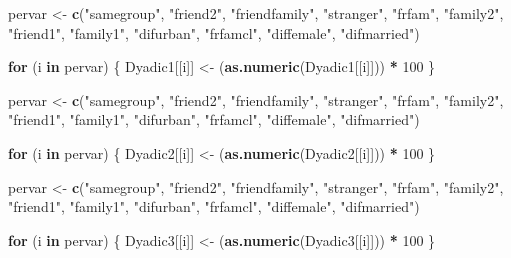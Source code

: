 \documentclass[]{tufte-handout}
\newenvironment{Shaded}{\begin{snugshade}}{\end{snugshade}}
\newcommand{\KeywordTok}[1]{\textcolor[rgb]{0.13,0.29,0.53}{\textbf{#1}}}
\newcommand{\DecValTok}[1]{\textcolor[rgb]{0.00,0.00,0.81}{#1}}
\newcommand{\StringTok}[1]{\textcolor[rgb]{0.31,0.60,0.02}{#1}}
\newcommand{\ControlFlowTok}[1]{\textcolor[rgb]{0.13,0.29,0.53}{\textbf{#1}}}
\newcommand{\OperatorTok}[1]{\textcolor[rgb]{0.81,0.36,0.00}{\textbf{#1}}}
\newcommand{\NormalTok}[1]{#1}
\begin{document}
\begin{Shaded}
\begin{Highlighting}[]
\NormalTok{pervar <-}\StringTok{ }\KeywordTok{c}\NormalTok{(}\StringTok{"samegroup"}\NormalTok{, }\StringTok{"friend2"}\NormalTok{, }\StringTok{"friendfamily"}\NormalTok{, }
    \StringTok{"stranger"}\NormalTok{, }\StringTok{"frfam"}\NormalTok{, }\StringTok{"family2"}\NormalTok{, }\StringTok{"friend1"}\NormalTok{, }
    \StringTok{"family1"}\NormalTok{, }\StringTok{"difurban"}\NormalTok{, }\StringTok{"frfamcl"}\NormalTok{, }\StringTok{"diffemale"}\NormalTok{, }
    \StringTok{"difmarried"}\NormalTok{)}

\ControlFlowTok{for}\NormalTok{ (i }\ControlFlowTok{in}\NormalTok{ pervar) \{}
\NormalTok{    Dyadic1[[i]] <-}\StringTok{ }\NormalTok{(}\KeywordTok{as.numeric}\NormalTok{(Dyadic1[[i]])) }\OperatorTok{*}\StringTok{ }
\StringTok{        }\DecValTok{100}
\NormalTok{\}}


\NormalTok{pervar <-}\StringTok{ }\KeywordTok{c}\NormalTok{(}\StringTok{"samegroup"}\NormalTok{, }\StringTok{"friend2"}\NormalTok{, }\StringTok{"friendfamily"}\NormalTok{, }
    \StringTok{"stranger"}\NormalTok{, }\StringTok{"frfam"}\NormalTok{, }\StringTok{"family2"}\NormalTok{, }\StringTok{"friend1"}\NormalTok{, }
    \StringTok{"family1"}\NormalTok{, }\StringTok{"difurban"}\NormalTok{, }\StringTok{"frfamcl"}\NormalTok{, }\StringTok{"diffemale"}\NormalTok{, }
    \StringTok{"difmarried"}\NormalTok{)}

\ControlFlowTok{for}\NormalTok{ (i }\ControlFlowTok{in}\NormalTok{ pervar) \{}
\NormalTok{    Dyadic2[[i]] <-}\StringTok{ }\NormalTok{(}\KeywordTok{as.numeric}\NormalTok{(Dyadic2[[i]])) }\OperatorTok{*}\StringTok{ }
\StringTok{        }\DecValTok{100}
\NormalTok{\}}

\NormalTok{pervar <-}\StringTok{ }\KeywordTok{c}\NormalTok{(}\StringTok{"samegroup"}\NormalTok{, }\StringTok{"friend2"}\NormalTok{, }\StringTok{"friendfamily"}\NormalTok{, }
    \StringTok{"stranger"}\NormalTok{, }\StringTok{"frfam"}\NormalTok{, }\StringTok{"family2"}\NormalTok{, }\StringTok{"friend1"}\NormalTok{, }
    \StringTok{"family1"}\NormalTok{, }\StringTok{"difurban"}\NormalTok{, }\StringTok{"frfamcl"}\NormalTok{, }\StringTok{"diffemale"}\NormalTok{, }
    \StringTok{"difmarried"}\NormalTok{)}

\ControlFlowTok{for}\NormalTok{ (i }\ControlFlowTok{in}\NormalTok{ pervar) \{}
\NormalTok{    Dyadic3[[i]] <-}\StringTok{ }\NormalTok{(}\KeywordTok{as.numeric}\NormalTok{(Dyadic3[[i]])) }\OperatorTok{*}\StringTok{ }
\StringTok{        }\DecValTok{100}
\NormalTok{\}}
\end{Highlighting}
\end{Shaded}
\end{document}
